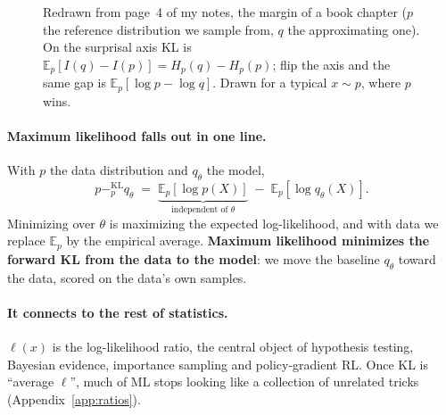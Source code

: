 \documentclass[11pt,oneside]{book}
\newcommand{\kl}[1]{\mathbin{-^{\mathrm{KL}}_{#1}}}       %
\newcommand{\E}{\mathbb{E}}
\theoremstyle{definition}
\theoremstyle{plain}
\theoremstyle{remark}
\begin{document}
\begin{figure}[t]
\centering
{}
\caption{Redrawn from page~4 of my notes, the margin of a book chapter ($p$ the reference distribution we sample
from, $q$ the approximating one). On the surprisal axis KL is $\E_p[I(q)-I(p)]=H_p(q)-H_p(p)$; flip the axis and the
same gap is $\E_p[\log p-\log q]$. Drawn for a typical $x\sim p$, where $p$ wins.}
\label{fig:axes}
\end{figure}

\paragraph{Maximum likelihood falls out in one line.} With $p$ the data distribution and $q_\theta$ the model,
\[
p\kl{p}q_\theta\;=\;\underbrace{\E_p[\log p(X)]}_{\text{independent of }\theta}\;-\;\E_p[\log q_\theta(X)].
\]
Minimizing over $\theta$ is maximizing the expected log-likelihood, and with data we replace $\E_p$ by the
empirical average. \textbf{Maximum likelihood minimizes the forward KL from the data to the model}: we move the
baseline $q_\theta$ toward the data, scored on the data's own samples.

\paragraph{It connects to the rest of statistics.} $\ell(x)$ is the log-likelihood ratio, the central object of
hypothesis testing, Bayesian evidence, importance sampling and policy-gradient RL. Once KL is ``average $\ell$'',
much of ML stops looking like a collection of unrelated tricks (Appendix~\ref{app:ratios}).
\end{document}
